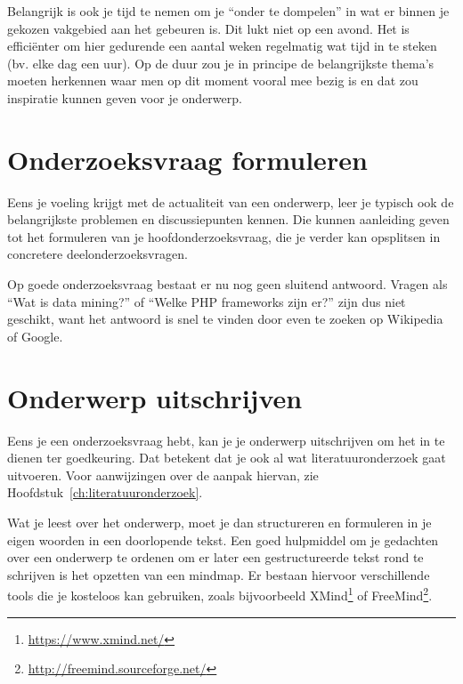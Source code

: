 Belangrijk is ook je tijd te nemen om je ``onder te dompelen'' in wat er binnen je gekozen vakgebied aan het gebeuren is. Dit lukt niet op een avond. Het is efficiënter om hier gedurende een aantal weken regelmatig wat tijd in te steken (bv. elke dag een uur). Op de duur zou je in principe de belangrijkste thema's moeten herkennen waar men op dit moment vooral mee bezig is en dat zou inspiratie kunnen geven voor je onderwerp.

\section{Onderzoeksvraag formuleren}
\label{sec:onderzoeksvraag_formuleren}

Eens je voeling krijgt met de actualiteit van een onderwerp, leer je typisch ook de belangrijkste problemen en discussiepunten kennen. Die kunnen aanleiding geven tot het formuleren van je hoofdonderzoeksvraag, die je verder kan opsplitsen in concretere deelonderzoeksvragen.


Op goede onderzoeksvraag bestaat er nu nog geen sluitend antwoord. Vragen als ``Wat is data mining?'' of ``Welke PHP frameworks zijn er?'' zijn dus niet geschikt, want het antwoord is snel te vinden door even te zoeken op Wikipedia of Google.

\section{Onderwerp uitschrijven}
\label{sec:onderwerp_uitschrijven}

Eens je een onderzoeksvraag hebt, kan je je onderwerp uitschrijven om het in te dienen ter goedkeuring. Dat betekent dat je ook al wat literatuuronderzoek gaat uitvoeren. Voor aanwijzingen over de aanpak hiervan, zie Hoofdstuk~\ref{ch:literatuuronderzoek}.

Wat je leest over het onderwerp, moet je dan structureren en formuleren in je eigen woorden in een doorlopende tekst. Een goed hulpmiddel om je gedachten over een onderwerp te ordenen om er later een gestructureerde tekst rond te schrijven is het opzetten van een mindmap. Er bestaan hiervoor verschillende tools die je kosteloos kan gebruiken, zoals bijvoorbeeld XMind\footnote{\url{https://www.xmind.net/}} of FreeMind\footnote{\url{http://freemind.sourceforge.net/}}.


